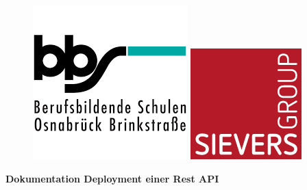 \documentclass[a4paper, 11pt]{scrartcl}
\begin{document}
\thispagestyle{empty}
\vspace{0.2\textheight}
\begin{center}
    \begin{figure}[H]
        \begin{minipage}{0.3\textwidth}
            \includegraphics[scale=0.6]{Bilder/BBS}
        \end{minipage}
        \hspace{0.48\textwidth}
        \begin{minipage}{0.3\textwidth}
            \includegraphics[scale=0.6]{Bilder/sievers.png}
        \end{minipage}
    \end{figure}
    \vspace{1cm}
    \begin{Huge}
        \textcolor{BBS}{\textbf{Dokumentation Deployment einer Rest API}}
    \end{Huge}
    \\

\end{center}
\end{document}
